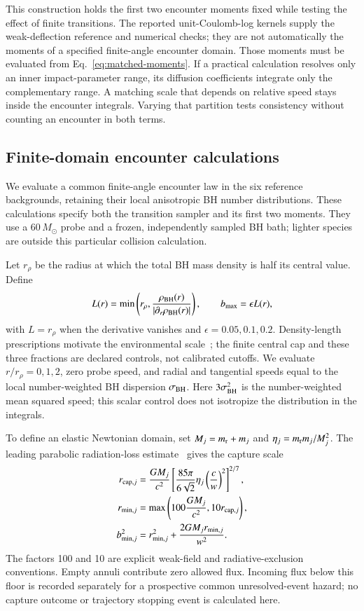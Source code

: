 \documentclass[aps,prd,reprint,amsmath,amssymb,superscriptaddress,nofootinbib,longbibliography,floatfix]{revtex4-2}
\begin{document}
This construction holds the first two encounter moments fixed while testing the effect of finite transitions. The reported unit-Coulomb-log kernels supply the weak-deflection reference and numerical checks; they are not automatically the moments of a specified finite-angle encounter domain. Those moments must be evaluated from Eq.~\eqref{eq:matched-moments}. If a practical calculation resolves only an inner impact-parameter range, its diffusion coefficients integrate only the complementary range. A matching scale that depends on relative speed stays inside the encounter integrals. Varying that partition tests consistency without counting an encounter in both terms.

\subsection{Finite-domain encounter calculations}

We evaluate a common finite-angle encounter law in the six reference backgrounds, retaining their local anisotropic BH number distributions. These calculations specify both the transition sampler and its first two moments. They use a $60\,M_\odot$ probe and a frozen, independently sampled BH bath; lighter species are outside this particular collision calculation.

Let $r_\rho$ be the radius at which the total BH mass density is half its central value. Define
\begin{equation}
L(r)=\min\left(r_\rho,\frac{\rho_{\rm BH}(r)}{|\partial_r\rho_{\rm BH}(r)|}\right),
\qquad b_{\max}=\epsilon L(r),
\label{eq:finite-domain-scale}
\end{equation}
with $L=r_\rho$ when the derivative vanishes and $\epsilon=0.05,0.1,0.2$. Density-length prescriptions motivate the environmental scale~\cite{Just2011,Petts2015}; the finite central cap and these three fractions are declared controls, not calibrated cutoffs. We evaluate $r/r_\rho=0,1,2$, zero probe speed, and radial and tangential speeds equal to the local number-weighted BH dispersion $\sigma_{\rm BH}$. Here $3\sigma_{\rm BH}^2$ is the number-weighted mean squared speed; this scalar control does not isotropize the distribution in the integrals.

To define an elastic Newtonian domain, set $M_j=m_{\rm r}+m_j$ and $\eta_j=m_{\rm r}m_j/M_j^2$. The leading parabolic radiation-loss estimate~\cite{OLeary2009} gives the capture scale
\begin{align}
r_{{\rm cap},j}&=\frac{GM_j}{c^2}
\left[\frac{85\pi}{6\sqrt{2}}\eta_j\left(\frac{c}{w}\right)^2\right]^{2/7},\nonumber\\
r_{\min,j}&=\max\left(100\frac{GM_j}{c^2},10r_{{\rm cap},j}\right),\nonumber\\
b_{\min,j}^2&=r_{\min,j}^2+\frac{2GM_jr_{\min,j}}{w^2}.
\label{eq:elastic-domain-floor}
\end{align}
The factors 100 and 10 are explicit weak-field and radiative-exclusion conventions. Empty annuli contribute zero allowed flux. Incoming flux below this floor is recorded separately for a prospective common unresolved-event hazard; no capture outcome or trajectory stopping event is calculated here.
\end{document}
